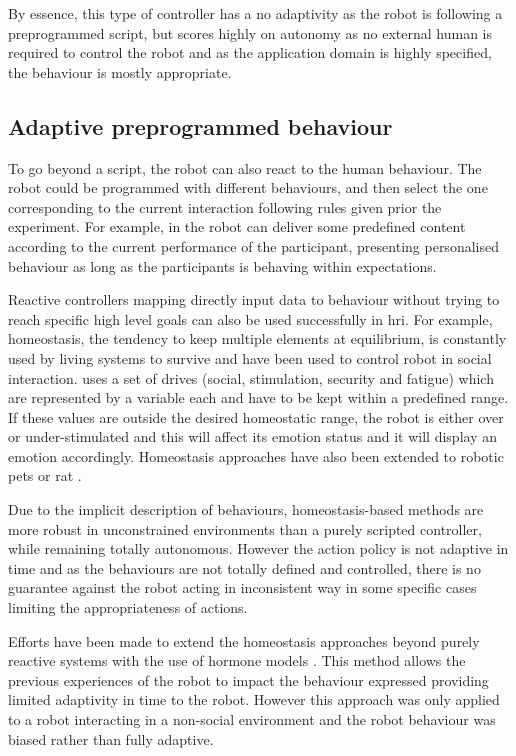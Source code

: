     By essence, this type of controller has a no adaptivity as the robot is following a preprogrammed script, but scores highly on autonomy as no external human is required to control the robot and as the application domain is highly specified, the behaviour is mostly appropriate.

\subsection{Adaptive preprogrammed behaviour}
	
	To go beyond a script, the robot can also react to the human behaviour. The robot could be programmed with different behaviours, and then select the one corresponding to the current interaction following rules given prior the experiment. For example, in \citet{leyzberg2014personalizing} the robot can deliver some predefined content according to the current performance of the participant, presenting personalised behaviour as long as the participants is behaving within expectations. 

	
	Reactive controllers mapping directly input data to behaviour without trying to reach specific high level goals can also be used successfully in \gls{hri}. For example, homeostasis, the tendency to keep multiple elements at equilibrium, is constantly used by living systems to survive and have been used to control robot in social interaction. \citet{breazeal1998motivational} uses a set of drives (social, stimulation, security and fatigue) which are represented by a variable each and have to be kept within a predefined range. If these values are outside the desired homeostatic range, the robot is either over or under-stimulated and this will affect its emotion status and it will display an emotion accordingly. Homeostasis approaches have also been extended to robotic pets \citep{arkin2003ethological} or \gls{rat} \citep{cao2017collaborative}.

	Due to the implicit description of behaviours, homeostasis-based methods are more robust in unconstrained environments than a purely scripted controller, while remaining totally autonomous. However the action policy is not adaptive in time and as the behaviours are not totally defined and controlled, there is no guarantee against the robot acting in inconsistent way in some specific cases limiting the appropriateness of actions.

	Efforts have been made to extend the homeostasis approaches beyond purely reactive systems with the use of hormone models \citep{Lones2014}. This method allows the previous experiences of the robot to impact the behaviour expressed providing limited adaptivity in time to the robot. However this approach was only applied to a robot interacting in a non-social environment and the robot behaviour was biased rather than fully adaptive.
	
